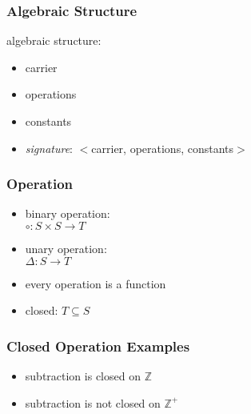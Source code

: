 \documentclass[dvipsnames]{beamer}
\begin{document}
\begin{frame}
  \frametitle{Algebraic Structure}

  \begin{definition}
    \alert{algebraic structure}:
    \begin{itemize}
      \item carrier
      \item operations
      \item constants
    \end{itemize}
  \end{definition}

  \pause
  \begin{itemize}
    \item \emph{signature}: $<$carrier, operations, constants$>$
  \end{itemize}
\end{frame}

\begin{frame}
  \frametitle{Operation}

  \begin{itemize}
    \item binary operation:\\
      $\circ: S \times S \rightarrow T$

    \item unary operation:\\
      $\Delta: S \rightarrow T$

    \pause
    \medskip
    \item every operation is a function

    \pause
    \medskip
    \item \alert{closed}: $T \subseteq S$
  \end{itemize}
\end{frame}

\begin{frame}
  \frametitle{Closed Operation Examples}

  \begin{example}
    \begin{itemize}
      \item subtraction is closed on $\mathbb{Z}$

      \pause
      \item subtraction is not closed on $\mathbb{Z^+}$
    \end{itemize}
  \end{example}
\end{frame}
\end{document}
